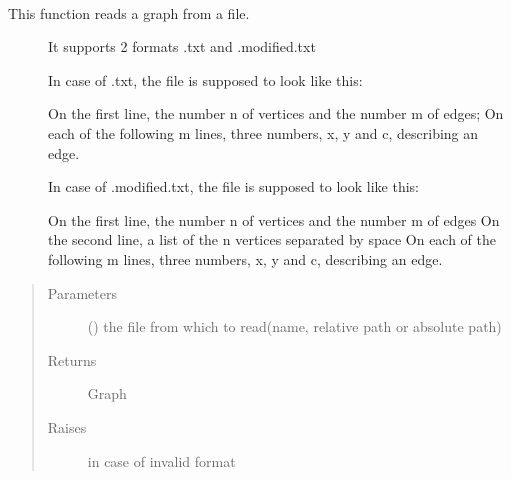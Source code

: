 \documentclass[letterpaper,10pt,english]{sphinxmanual}
\begin{document}

\begin{fulllineitems}
\label{\detokenize{UndirectedGraph:UndirectedGraph.read_graph}}~\begin{description}
\item[{This function reads a graph from a file.}] \leavevmode
It supports 2 formats
.txt and  .modified.txt

In case of .txt, the file is supposed to look like this:

On the first line, the number n of vertices and the number m of edges;
On each of the following m lines, three numbers, x, y and c, describing an edge.

In case of .modified.txt, the file is supposed to look like this:

On the first line, the number n of vertices and the number m of edges
On the second line, a list of the n vertices separated by space
On each of the following m lines, three numbers, x, y and c, describing an edge.

\end{description}
\begin{quote}\begin{description}
\item[{Parameters}] \leavevmode
{} () \textendash{} the file from which to read(name, relative path or absolute path)

\item[{Returns}] \leavevmode
Graph

\item[{Raises}] \leavevmode
{} \textendash{} in case of invalid format

\end{description}\end{quote}

\end{fulllineitems}

\end{document}
